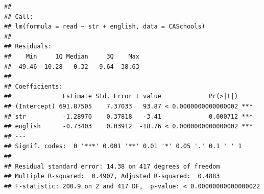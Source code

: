 \documentclass[
]{book}
\newenvironment{Shaded}{\begin{snugshade}}{\end{snugshade}}
\newcommand{\DataTypeTok}[1]{\textcolor[rgb]{0.13,0.29,0.53}{#1}}
\newcommand{\DecValTok}[1]{\textcolor[rgb]{0.00,0.00,0.81}{#1}}
\newcommand{\KeywordTok}[1]{\textcolor[rgb]{0.13,0.29,0.53}{\textbf{#1}}}
\newcommand{\NormalTok}[1]{#1}
\newcommand{\OperatorTok}[1]{\textcolor[rgb]{0.81,0.36,0.00}{\textbf{#1}}}
\newcommand{\OtherTok}[1]{\textcolor[rgb]{0.56,0.35,0.01}{#1}}
\newcommand{\StringTok}[1]{\textcolor[rgb]{0.31,0.60,0.02}{#1}}
\begin{document}
\begin{Shaded}
\end{Shaded}

\begin{verbatim}
## 
## Call:
## lm(formula = read ~ str + english, data = CASchools)
## 
## Residuals:
##    Min     1Q Median     3Q    Max 
## -49.46 -10.28  -0.32   9.64  38.63 
## 
## Coefficients:
##              Estimate Std. Error t value             Pr(>|t|)    
## (Intercept) 691.87505    7.37033   93.87 < 0.0000000000000002 ***
## str          -1.28970    0.37818   -3.41             0.000712 ***
## english      -0.73403    0.03912  -18.76 < 0.0000000000000002 ***
## ---
## Signif. codes:  0 '***' 0.001 '**' 0.01 '*' 0.05 '.' 0.1 ' ' 1
## 
## Residual standard error: 14.38 on 417 degrees of freedom
## Multiple R-squared:  0.4907, Adjusted R-squared:  0.4883 
## F-statistic: 200.9 on 2 and 417 DF,  p-value: < 0.00000000000000022
\end{verbatim}
\end{document}
